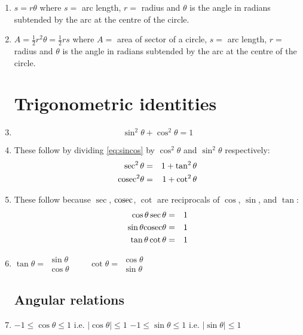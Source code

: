 \documentclass[a4paper]{article}
\begin{document}
\begin{enumerate}
\item
$s=r\theta$ where 
$s=$ arc length, $r=$ radius and $\theta$ 
is the angle in radians subtended by the arc at the centre of the circle.

\item
$A=\frac{1}{2} r^2 \theta = \frac{1}{2}rs$ where $A=$ area
of sector of a circle,
$s=$ arc length, $r=$ radius and $\theta$ 
is the angle in radians subtended by the arc at the centre of the circle.

\section{Trigonometric identities}

\item
\begin{equation}\label{eq:sincos}
\sin^2 \theta + \cos^2 \theta = 1
\end{equation}

\item
These follow by dividing \ref{eq:sincos} by $\cos^2\theta$ and $\sin^2 \theta$
respectively:
\begin{eqnarray}
\sec^2 \theta &=& 1+ \tan^2 \theta \\
\mathrm{cosec}^2 \theta &=& 1+ \cot^2 \theta
\end{eqnarray}

\item
These follow because $\sec$, $\mathrm{cosec}$, $\cot$ are reciprocals of 
$\cos$, $\sin$, and $\tan$:
\begin{eqnarray}
\cos\theta\sec\theta&=&1 \\
\sin\theta\mathrm{cosec}\theta&=&1 \\
\tan\theta\cot\theta&=&1
\end{eqnarray}

\item
$\tan \theta = 
\begin{array}{c} \sin \theta \\ \hline \cos\theta \end{array}
\qquad
\cot \theta =
\begin{array}{c} \cos \theta \\ \hline \sin\theta\end{array}
$

\subsection{Angular relations}

\item
$-1 \leq \cos \theta \leq 1$ i.e. $| \cos \theta | \leq 1$
\qquad
$-1 \leq \sin \theta \leq 1$ i.e. $| \sin \theta | \leq 1$


\end{enumerate}
\end{document}
